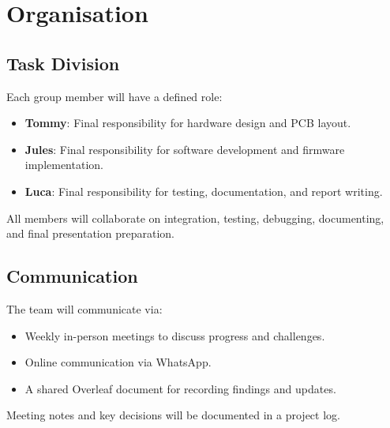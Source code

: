 \section{Organisation}
\subsection{Task Division}
Each group member will have a defined role:
\begin{itemize}
    \item \textbf{Tommy}: Final responsibility for hardware design and PCB layout.
    \item \textbf{Jules}: Final responsibility for software development and firmware implementation.
    \item \textbf{Luca}: Final responsibility for testing, documentation, and report writing.
\end{itemize}
All members will collaborate on integration, testing, debugging, documenting, and final presentation preparation.

\subsection{Communication}
The team will communicate via:
\begin{itemize}
    \item Weekly in-person meetings to discuss progress and challenges.
    \item Online communication via WhatsApp.
    \item A shared Overleaf document for recording findings and updates.
\end{itemize}
Meeting notes and key decisions will be documented in a project log.

